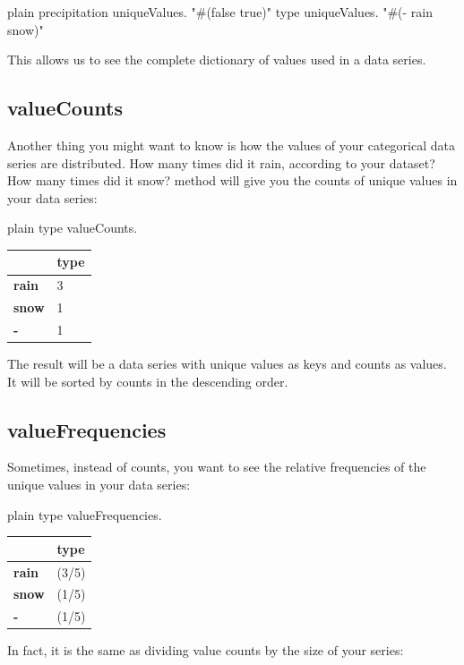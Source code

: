 \documentclass[10pt,twoside,english]{_support/latex/sbabook/sbabook}
\begin{document}
\begin{displaycode}{plain}
precipitation uniqueValues. "#(false true)"
type uniqueValues. "#(- rain snow)"
\end{displaycode}

This allows us to see the complete dictionary of values used in a data series.
\subsection{valueCounts}
Another thing you might want to know is how the values of your categorical data series are distributed. How many times did it rain, according to your dataset? How many times did it snow?  method will give you the counts of unique values in your data series:

\begin{displaycode}{plain}
type valueCounts.
\end{displaycode}

\begin{tabular}{ll}
\toprule
 & \textbf{type} \\
\midrule
\textbf{rain} & 3 \\
\textbf{snow} & 1 \\
\textbf{-} & 1 \\
\bottomrule
\end{tabular}

The result will be a data series with unique values as keys and counts as values. It will be sorted by counts in the descending order.
\subsection{valueFrequencies}
Sometimes, instead of counts, you want to see the relative frequencies of the unique values in your data series:

\begin{displaycode}{plain}
type valueFrequencies.
\end{displaycode}

\begin{tabular}{ll}
\toprule
 & \textbf{type} \\
\midrule
\textbf{rain} & (3/5) \\
\textbf{snow} & (1/5) \\
\textbf{-} & (1/5) \\
\bottomrule
\end{tabular}

In fact, it is the same as dividing value counts by the size of your series:
\end{document}
